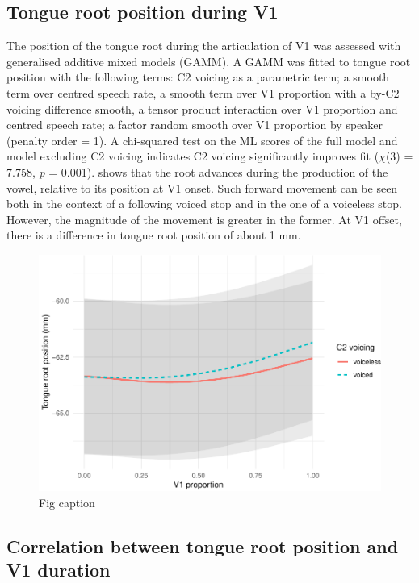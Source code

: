 \documentclass[12pt,]{article}
\begin{document}
\hypertarget{tongue-root-position-during-v1}{%
\subsection{Tongue root position during
V1}\label{tongue-root-position-during-v1}}

The position of the tongue root during the articulation of V1 was
assessed with generalised additive mixed models (GAMM). A GAMM was
fitted to tongue root position with the following terms: C2 voicing as a
parametric term; a smooth term over centred speech rate, a smooth term
over V1 proportion with a by-C2 voicing difference smooth, a tensor
product interaction over V1 proportion and centred speech rate; a factor
random smooth over V1 proportion by speaker (penalty order = 1). A
chi-squared test on the ML scores of the full model and model excluding
C2 voicing indicates C2 voicing significantly improves fit (\(\chi\)(3)
= 7.758, \emph{p} = 0.001).  shows that the root
advances during the production of the vowel, relative to its position at
V1 onset. Such forward movement can be seen both in the context of a
following voiced stop and in the one of a voiceless stop. However, the
magnitude of the movement is greater in the former. At V1 offset, there
is a difference in tongue root position of about 1 mm.

\begin{figure}
\includegraphics[width=\linewidth]{2018-tra_files/figure-latex/tra-gam-plot, -1} \caption{Fig caption}\label{f:tra-gam-plot, }
\end{figure}

\hypertarget{correlation-between-tongue-root-position-and-v1-duration}{%
\subsection{Correlation between tongue root position and V1
duration}\label{correlation-between-tongue-root-position-and-v1-duration}}
\end{document}
